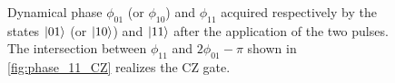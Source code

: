 \documentclass[rmp,10pt,onecolumn,fleqn,notitlepage]{revtex4-1}
\begin{document}
\begin{figure}[H]
\begin{minipage}[c]{0.49\linewidth}
\end{minipage}
\begin{minipage}[]{0.49\linewidth}
\centering
{}
\end{minipage}
\caption{Dynamical phase $\phi_{01}$ (or $\phi_{10}$) and $\phi_{11}$ acquired respectively by the states $\left\vert{01}\right\rangle$ (or $\left\vert{10}\right\rangle$) and $\left\vert{11}\right\rangle$ after the application of the two pulses. The intersection between $\phi_{11}$ and $2\phi_{01}-\pi$ shown in \ref{fig:phase_11_CZ} realizes the CZ gate. }
\label{fig:phase_perfect-blockade}
\end{figure}
\end{document}
